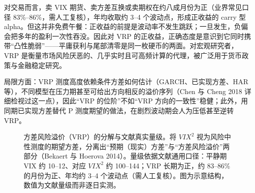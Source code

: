 \documentclass[11pt,a4paper]{ctexart}
\begin{document}
对交易而言，卖 VIX 期货、卖方差互换或卖期权在约八成月份为正（业界常见口径 83\%–86\%，需人工复核），年均收取约 3–4 个波动点，形成正收益的 carry 型 alpha。但这并非免费午餐：正收益的前提是波动率不发生跳跃；一旦发生，负偏会把多年的盈利一次性吞没。因此对 VRP 的正收益，正确态度是意识到它同时携带“凸性脆弱”——平庸获利与尾部清零是同一枚硬币的两面。对宏观研究者，VRP 是衡量市场风险厌恶的、几乎实时且可高频计算的代理，被广泛用于货币政策与金融稳定研究。

局限方面：VRP 测度高度依赖条件方差如何估计（GARCH、已实现方差、HAR 等），不同模型在压力期甚至可给出方向相反的溢价序列（Chen 与 Cheng 2018 详细检视过这一点），因此“VRP 的位阶”不如“VRP 方向的一致性”稳健；此外，用同期已实现方差替代 P 测度期望的做法，在剧烈波动期会人为压低甚至逆转 VRP。

\begin{figure}[htbp]
\centering
{}
\caption{方差风险溢价（VRP）的分解与文献真实量级。将 $VIX^2$ 视为风险中性测度的期望方差，分离出“预期（现实）方差”与“方差风险溢价”两部分（Bekaert 与 Hoerova 2014）。量级依据文献通用口径：平静期 VIX 约 10–12、对应 $VIX^2$ 约 100–144；VRP 长期为正，约 83–86\% 的月份为正、年均约 3–4 个波动点（需人工复核）。图为示意结构，数值为文献量级而非逐日实测。}
\label{fig:vrp}
\end{figure}
\end{document}
